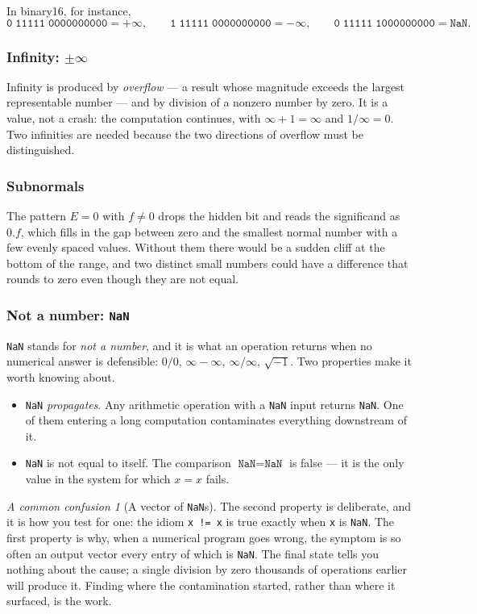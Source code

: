 \documentclass[11pt]{article}
\theoremstyle{plain}
\theoremstyle{definition}
\theoremstyle{remark}
\newtheorem*{warn}{A common confusion}
\begin{document}
\noindent In binary16, for instance,
\[
  \texttt{0}\;\texttt{11111}\;\texttt{0000000000} = +\infty,
  \qquad
  \texttt{1}\;\texttt{11111}\;\texttt{0000000000} = -\infty,
  \qquad
  \texttt{0}\;\texttt{11111}\;\texttt{1000000000} = \texttt{NaN} .
\]

\subsubsection*{Infinity: $\pm\infty$}
Infinity is produced by \emph{overflow} --- a result whose magnitude exceeds the
largest representable number --- and by division of a nonzero number by zero. It
is a value, not a crash: the computation continues, with $\infty+1=\infty$ and
$1/\infty = 0$. Two infinities are needed because the two directions of overflow
must be distinguished.

\subsubsection*{Subnormals}
The pattern $E=0$ with $f\neq0$ drops the hidden bit and reads the significand as
$0.f$, which fills in the gap between zero and the smallest normal number with a
few evenly spaced values. Without them there would be a sudden cliff at the
bottom of the range, and two distinct small numbers could have a difference that
rounds to zero even though they are not equal.

\subsubsection*{Not a number: \texttt{NaN}}
\texttt{NaN} stands for \emph{not a number}, and it is what an operation returns
when no numerical answer is defensible: $0/0$, $\infty-\infty$, $\infty/\infty$,
$\sqrt{-1}$. Two properties make it worth knowing about.

\begin{itemize}[leftmargin=1.4em,itemsep=4pt]
  \item \texttt{NaN} \emph{propagates}. Any arithmetic operation with a
        \texttt{NaN} input returns \texttt{NaN}. One of them entering a long
        computation contaminates everything downstream of it.
  \item \texttt{NaN} is not equal to itself. The comparison
        $\texttt{NaN}=\texttt{NaN}$ is false --- it is the only value in the
        system for which $x=x$ fails.
\end{itemize}

\begin{warn}[A vector of \texttt{NaN}s]
The second property is deliberate, and it is how you test for one: the idiom
\texttt{x != x} is true exactly when \texttt{x} is \texttt{NaN}. The first
property is why, when a numerical program goes wrong, the symptom is so often an
output vector every entry of which is \texttt{NaN}. The final state tells you
nothing about the cause; a single division by zero thousands of operations
earlier will produce it. Finding where the contamination started, rather than
where it surfaced, is the work.
\end{warn}
\end{document}
